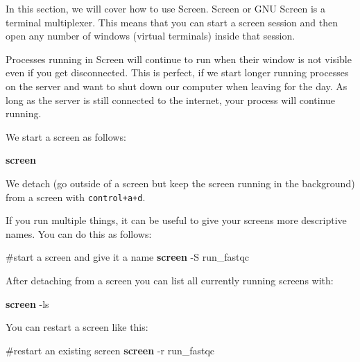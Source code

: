 \documentclass[
  letterpaper,
  DIV=11,
  numbers=noendperiod]{scrreprt}
\newenvironment{Shaded}{}{}
\newcommand{\AttributeTok}[1]{\textcolor[rgb]{0.84,0.23,0.29}{#1}}
\newcommand{\CommentTok}[1]{\textcolor[rgb]{0.42,0.45,0.49}{#1}}
\newcommand{\ExtensionTok}[1]{\textcolor[rgb]{0.84,0.23,0.29}{\textbf{#1}}}
\newcommand{\NormalTok}[1]{\textcolor[rgb]{0.14,0.16,0.18}{#1}}
\begin{document}
In this section, we will cover how to use Screen. Screen or GNU Screen
is a terminal multiplexer. This means that you can start a screen
session and then open any number of windows (virtual terminals) inside
that session.

Processes running in Screen will continue to run when their window is
not visible even if you get disconnected. This is perfect, if we start
longer running processes on the server and want to shut down our
computer when leaving for the day. As long as the server is still
connected to the internet, your process will continue running.

We start a screen as follows:

\begin{Shaded}
\begin{Highlighting}[]
\ExtensionTok{screen}
\end{Highlighting}
\end{Shaded}

We detach (go outside of a screen but keep the screen running in the
background) from a screen with \texttt{control+a+d}.

If you run multiple things, it can be useful to give your screens more
descriptive names. You can do this as follows:

\begin{Shaded}
\begin{Highlighting}[]
\CommentTok{\#start a screen and give it a name}
\ExtensionTok{screen} \AttributeTok{{-}S}\NormalTok{ run\_fastqc}
\end{Highlighting}
\end{Shaded}

After detaching from a screen you can list all currently running screens
with:

\begin{Shaded}
\begin{Highlighting}[]
\ExtensionTok{screen} \AttributeTok{{-}ls}
\end{Highlighting}
\end{Shaded}

You can restart a screen like this:

\begin{Shaded}
\begin{Highlighting}[]
\CommentTok{\#restart an existing screen}
\ExtensionTok{screen} \AttributeTok{{-}r}\NormalTok{ run\_fastqc}
\end{Highlighting}
\end{Shaded}
\end{document}
